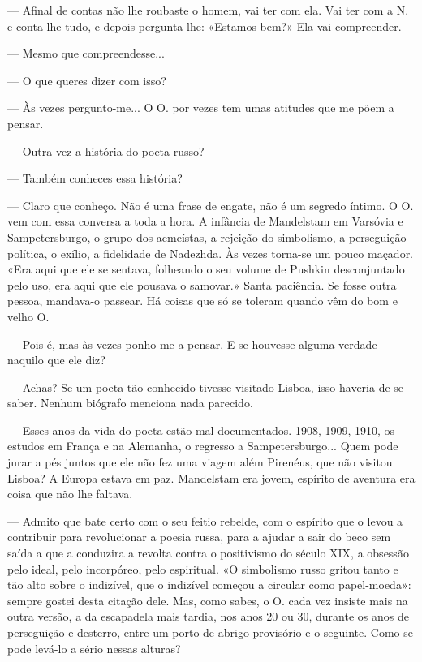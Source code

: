 --- Afinal de contas não lhe roubaste o homem, vai ter com ela. Vai ter
  com a N. e conta-lhe tudo, e depois pergunta-lhe: «Estamos bem?» Ela vai compreender.

--- Mesmo que compreendesse...

--- O que queres dizer com isso?

--- Às vezes pergunto-me... O O. por vezes tem umas atitudes que me põem
  a pensar.

--- Outra vez a história do poeta russo?

--- Também conheces essa história?

--- Claro que conheço. Não é uma frase de engate, não é um segredo íntimo.
  O O. vem com essa conversa a toda a hora. A infância de Mandelstam em
  Varsóvia e Sampetersburgo, o grupo dos acmeístas, a rejeição do
  simbolismo, a perseguição política, o exílio, a fidelidade de
  Nadezhda. Às vezes torna-se um pouco maçador. «Era aqui que ele se
  sentava, folheando o seu volume de Pushkin desconjuntado pelo uso, era
  aqui que ele pousava o samovar.» Santa paciência. Se fosse outra
  pessoa, mandava-o passear. Há coisas que só se toleram quando vêm do
  bom e velho O.

--- Pois é, mas às vezes ponho-me a pensar. E se houvesse alguma verdade
  naquilo que ele diz?

--- Achas? Se um poeta tão conhecido tivesse visitado Lisboa, isso
  haveria de se saber. Nenhum biógrafo menciona nada parecido.

--- Esses anos da vida do poeta estão mal documentados. 1908, 1909, 1910,
  os estudos em França e na Alemanha, o regresso a Sampetersburgo...
  Quem pode jurar a pés juntos que ele não fez uma viagem além Pirenéus,
  que não visitou Lisboa? A Europa estava em paz. Mandelstam era jovem,
  espírito de aventura era coisa que não lhe faltava.




--- Admito que bate certo com o seu feitio rebelde, com o espírito que o
  levou a contribuir para revolucionar a poesia russa, para a ajudar a
  sair do beco sem saída a que a conduzira a revolta contra o
  positivismo do século XIX, a obsessão pelo ideal, pelo incorpóreo,
  pelo espiritual. «O simbolismo russo gritou tanto e tão alto sobre o
  indizível, que o indizível começou a circular como papel-moeda»:
  sempre gostei desta citação dele. Mas, como sabes, o O. cada vez
  insiste mais na outra versão, a da escapadela mais tardia, nos anos 20
  ou 30, durante os anos de perseguição e desterro, entre um porto de
  abrigo provisório e o seguinte. Como se pode levá-lo a sério nessas
  alturas?

